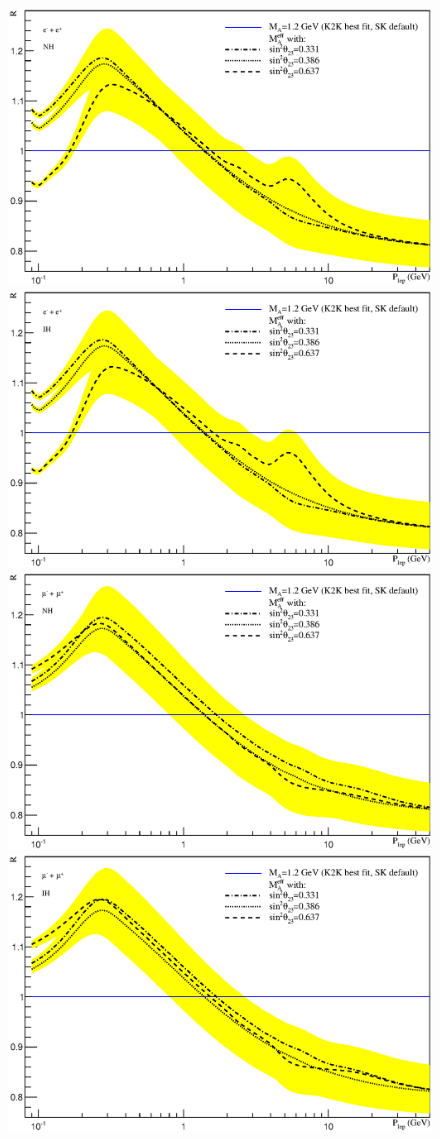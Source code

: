 \begin{figure}[htb!]
\begin{center}
\includegraphics[width=0.9\columnwidth]{./SK/t23Ematne_11.eps}
\includegraphics[width=0.9\columnwidth]{./SK/t23Ematie_11.eps}
\includegraphics[width=0.9\columnwidth]{./SK/t23Ematnm_11.eps}
\includegraphics[width=0.9\columnwidth]{./SK/t23Ematim_11.eps}

\end{center}
\end{figure}
